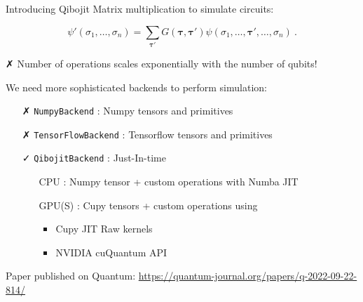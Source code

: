 \documentclass[11p,aspectratio=169]{beamer}
\begin{document}

\begin{frame}{Introducing Qibojit}
    Matrix multiplication to simulate circuits:

    \begin{equation*}\label{eq:gateapplication}
        \psi'(\sigma_1, \ldots, \sigma_n) = \sum _{\boldsymbol{\tau'}} G(\boldsymbol{\tau}, \boldsymbol{\tau'})\psi(\sigma_1,\ldots,\boldsymbol{\tau'},\ldots,\sigma_n) \ .
    \end{equation*}

    
    
    { \color{red} \faClose}  Number of operations scales { \color{red} exponentially} with the number of qubits!
   
    We need more sophisticated backends to perform simulation:
    \begin{itemize}
        \item[{ \color{red} \faClose}] \texttt{NumpyBackend} : { \color{blue} Numpy} tensors and primitives
        \item[{ \color{red} \faClose}] \texttt{TensorFlowBackend} : { \color{orange} Tensorflow} tensors and primitives
        \item[{ \color{green} \faCheck}] \texttt{QibojitBackend} : Just-In-time
        \item[]     \begin{itemize}
            \item[\faCode] CPU : { \color{blue} Numpy} tensor + custom operations with {\color{cyan} Numba JIT}
            \item[\faCode] GPU(S) : {\color{teal} Cupy} tensors + custom operations using
            \begin{itemize}
                \item  {\color{teal} Cupy JIT} Raw kernels
                \item  {\color{green} NVIDIA cuQuantum}  API
            \end{itemize} 
        \end{itemize}
    \end{itemize}

    Paper published on Quantum: \url{https://quantum-journal.org/papers/q-2022-09-22-814/}

    
\end{frame}
\end{document}
